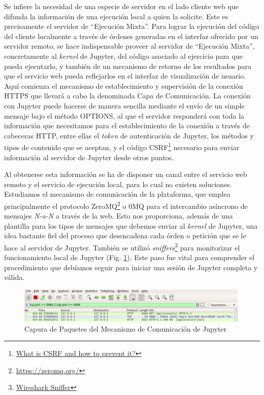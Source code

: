 Se infiere la necesidad de una especie de servidor en el lado cliente web que difunda la información de una ejecución local a quien la solicite. Este es precisamente el servidor de ``Ejecución Mixta''. Para lograr la ejecución del código del cliente localmente a través de órdenes generadas en el interfaz ofrecido por un servidor remoto, se hace indispensable proveer al servidor de ``Ejecución Mixta'', concretamente al \textit{kernel} de Jupyter, del código asociado al ejercicio para que pueda ejecutarlo, y también de un mecanismo de retorno de los resultados para que el servicio web pueda reflejarlos en el interfaz de visualización de usuario. Aquí comienza el mecanismo de establecimiento y supervisión de la conexión HTTPS que llevará a cabo la denominada Capa de Comunicación. La conexión con Jupyter puede hacerse de manera sencilla mediante el envío de un simple mensaje bajo el método OPTIONS, al que el servidor responderá con toda la información que necesitamos para el establecimiento de la conexión a través de cabeceras HTTP, entre ellas el \textit{token} de autenticación de Jupyter, los métodos y tipos de contenido que se aceptan, y el código CSRF\footnote{\href{https://www.geeksforgeeks.org/what-is-cross-site-request-forgery-csrf/}{What is CSRF and how to prevent it?}} necesario para enviar información al servidor de Jupyter desde otros puntos.

Al obtenerse esta información se ha de disponer un canal entre el servicio web remoto y el servicio de ejecución local, para lo cual no existen soluciones. Estudiamos el mecanismo de comunicación de la plataforma, que emplea principalmente el protocolo ZeroMQ\footnote{\url{https://zeromq.org/}} o 0MQ para el intercambio asíncrono de mensajes \textit{N-a-N} a través de la web. Esto nos proporciona, además de una plantilla para los tipos de mensajes que debemos enviar al \textit{kernel} de Jupyter, una idea bastante fiel del proceso que desencadena cada órden o petición que se le hace al servidor de Jupyter. También se utilizó \textit{sniffers}\footnote{\href{https://www.wireshark.org/\#1398253364-1-69}{Wireshark Sniffer}} para monitorizar el funcionamiento local de Jupyter (Fig. \ref{wireshark}). Este paso fue vital para comprender el procedimiento que debíamos seguir para iniciar una sesión de Jupyter completa y válida.

\begin{figure}[!hp]  \centering\noindent
    \includegraphics[width=0.99\textwidth]{figures/wireshark.png}
    \caption{Capura de Paquetes del Mecanismo de Comunicación de Jupyter}
    \label{wireshark}
\end{figure}


